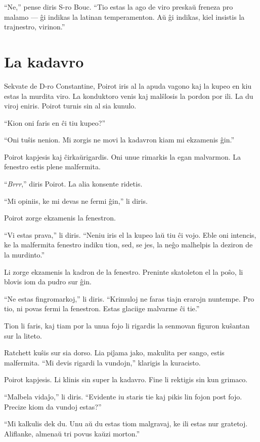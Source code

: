 ``Ne,'' pense diris S-ro Bouc. ``Tio estas la ago de viro preskaŭ freneza pro malamo --- ĝi indikas la latinan temperamenton. Aŭ ĝi indikas, kiel insistis la trajnestro, virinon.''

\chapter[La kadavro]{La kadavro}


Sekvate de D-ro Constantine, Poirot iris al la apuda vagono kaj la kupeo en kiu estas la murdita viro. La konduktoro venis kaj malŝlosis la pordon por ili. La du viroj eniris. Poirot turnis sin al sia kunulo.

``Kion oni faris en ĉi tiu kupeo?''

``Oni tuŝis nenion. Mi zorgis ne movi la kadavron kiam mi ekzamenis ĝin.''

Poirot kapjesis kaj ĉirkaŭrigardis. Oni unue rimarkis la egan malvarmon. La fenestro estis plene malfermita.

``\emph{Brrr},'' diris Poirot. La alia konsente ridetis.

``Mi opiniis, ke mi devas ne fermi ĝin,'' li diris.

Poirot zorge ekzamenis la fenestron.

``Vi estas prava,'' li diris. ``Neniu iris el la kupeo laŭ tiu ĉi vojo. Eble oni intencis, ke la malfermita fenestro indiku tion, sed, se jes, la neĝo malhelpis la deziron de la murdinto.''

Li zorge ekzamenis la kadron de la fenestro. Preninte skatoleton el la poŝo, li blovis iom da pudro sur ĝin.

``Ne estas fingromarkoj,'' li diris. ``Krimuloj ne faras tiajn erarojn nuntempe. Pro tio, ni povas fermi la fenestron. Estas glaciige malvarme ĉi tie.''

Tion li faris, kaj tiam por la unua fojo li rigardis la senmovan figuron kuŝantan sur la liteto.

Ratchett kuŝis sur sia dorso. Lia piĵama jako, makulita per sango, estis malfermita. ``Mi devis rigardi la vundojn,'' klarigis la kuracisto.

Poirot kapjesis. Li klinis sin super la kadavro. Fine li rektigis sin kun grimaco.

``Malbela vidaĵo,'' li diris. ``Evidente iu staris tie kaj pikis lin fojon post fojo. Precize kiom da vundoj estas?''

``Mi kalkulis dek du. Unu aŭ du estas tiom malgravaj, ke ili estas nur gratetoj. Aliflanke, almenaŭ tri povus kaŭzi morton.''

